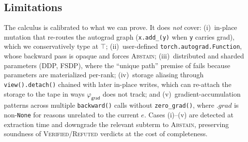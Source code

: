 \subsection{Limitations}
\label{sec:rt:limitations}

The calculus is calibrated to what we can prove. It does
\emph{not} cover: (i)~in-place mutation that re-routes the
autograd graph (\texttt{x.add\_(y)} when \texttt{y} carries grad),
which we conservatively type at $\top$; (ii)~user-defined
\texttt{torch.autograd.Function}, whose backward pass is opaque
and forces \textsc{Abstain}; (iii)~distributed and sharded
parameters (DDP, FSDP), where the ``unique path'' premise of
 fails because parameters are
materialized per-rank; (iv)~storage aliasing through
\texttt{view().detach()} chained with later in-place writes,
which can re-attach the storage to the tape in ways
$\varphi_{\mathsf{grad}}$ does not track; and
(v)~gradient-accumulation patterns across multiple
\texttt{backward()} calls without \texttt{zero\_grad()}, where
$.grad$ is non-\texttt{None} for reasons unrelated to the current
$e$. Cases (i)--(v) are detected at extraction time and downgrade
the relevant subterm to \textsc{Abstain}, preserving soundness of
\textsc{Verified}/\textsc{Refuted} verdicts at the cost of
completeness.


